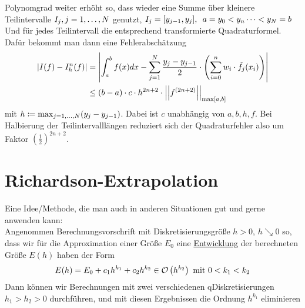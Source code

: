\documentclass[11pt,a4paper,oneside]{scrartcl}
\begin{document}
{Polynomgrad weiter erhöht so, dass wieder eine Summe über kleinere Teilintervalle $I_j, j = 1,\dots, N$ genutzt,
$I_j = [y_{j-1}, y_j], \hspace{.5em} a=y_0< y_n \dots < y_N = b$
Und für jedes Teilintervall die entsprechend transformierte Quadraturformel. Dafür bekommt man
dann eine Fehlerabschätzung \begin{align*}
        \left\vert I(f) - I_h^{n}(f) \right\vert &= \left\vert \int_a^b f(x)dx - \sum_{j=1}^N \frac{y_j-y_{j-1}}{2}\cdot \left(\sum_{i=0}^n w_i \cdot \Tilde{f_j}(x_i)\right) \right\vert\\
        &\leq (b-a)\cdot c \cdot h^{2n+2}\cdot \left\vert\left\vert f^{(2n+2)}\right\vert\right\vert_{\max[a,b]}
    \end{align*}
    mit $h\coloneqq \max_{j = 1,\dots, N}(y_j-y_{j-1})$. Dabei ist $c$ unabhängig von $a,b,h,f$.
    Bei Halbierung der Teilintervalllängen reduziert sich der Quadraturfehler also um 
    Faktor $\left(\frac{1}{2}\right)^{2n+2}$.
\section{Richardson-Extrapolation}
Eine Idee/Methode, die man auch in anderen Situationen gut und gerne anwenden 
kann:\\
Angenommen Berechnungsvorschrift mit Diskretisierungsgröße $h > 0$, $h\searrow 0$
so, dass wir für die Approximation einer Größe $E_0$ eine \underline{Entwicklung}
der berechneten Größe $E(h)$ haben der Form \[
    E(h)  = E_0 + c_1h^{k_1}+c_2h^{k_2} \in \calO{h^{k_2}}\text{ mit }0<k_1<k_2
\] 
Dann können wir Berechnungen mit zwei verschiedenen qDiskretisierungen $h_1 > h_2 
> 0$ durchführen, und mit diesen Ergebnissen die Ordnung $h^{k_1}$ eliminieren










\tjadosize{}





}
\end{document}
